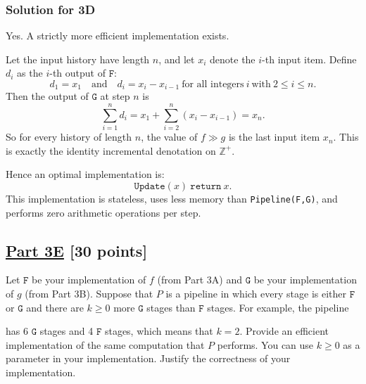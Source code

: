 \documentclass[11pt]{article}
\newcommand{\Z}{\mathbb{Z}}
\newcommand{\kplus}{^+}
\newcommand{\serial}{\gg}
\newcommand{\F}{\texttt{F}}
\newcommand{\G}{\texttt{G}}
\begin{document}
\subsubsection*{Solution for 3D}

Yes. A strictly more efficient implementation exists.

Let the input history have length $n$, and let $x_i$ denote the $i$-th input item. Define $d_i$ as the $i$-th output of $\F$:
\[
d_1=x_1
\quad\text{and}\quad
d_i=x_i-x_{i-1}\ \text{for all integers}\ i\ \text{with}\ 2\le i\le n.
\]
Then the output of $\G$ at step $n$ is
\[
\sum_{i=1}^{n}d_i
=
x_1+\sum_{i=2}^{n}(x_i-x_{i-1})
=x_n.
\]
So for every history of length $n$, the value of $f \serial g$ is the last input item $x_n$. This is exactly the identity incremental denotation on $\Z\kplus$.

Hence an optimal implementation is:
\[
\texttt{Update}(x)\ \texttt{return}\ x.
\]
This implementation is stateless, uses less memory than \texttt{Pipeline(\F,\G)}, and performs zero arithmetic operations per step.

\subsection*{\underline{Part 3E} [30 points]}

Let $\F$ be your implementation of $f$ (from Part 3A) and $\G$ be your implementation of $g$ (from Part 3B). Suppose that $P$ is a pipeline in which every stage is either $\F$ or $\G$ and there are $k \geq 0$ more $\G$ stages than $\F$ stages. For example, the pipeline
\begin{center}
\end{center}
has 6 $\G$ stages and 4 $\F$ stages, which means that $k = 2$. Provide an efficient implementation of the same computation that $P$ performs. You can use $k \geq 0$ as a parameter in your implementation. Justify the correctness of your implementation.
\end{document}
